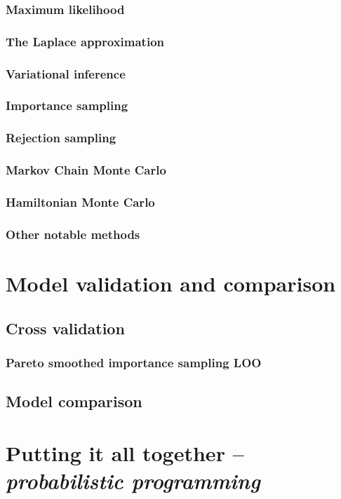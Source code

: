\documentclass[11pt]{report}
\begin{document}
\subsubsection{Maximum likelihood}
\subsubsection{The Laplace approximation}
\subsubsection{Variational inference}
\subsubsection{Importance sampling}
\subsubsection{Rejection sampling}
\subsubsection{Markov Chain Monte Carlo}
\subsubsection{Hamiltonian Monte Carlo}
\subsubsection{Other notable methods}

\section{Model validation and comparison}
\label{sec:model_comparison}
\subsection{Cross validation}
\subsubsection{Pareto smoothed importance sampling LOO}
\subsection{Model comparison}

\section{Putting it all together -- \emph{probabilistic programming}}
\label{sec:programming}
\end{document}
